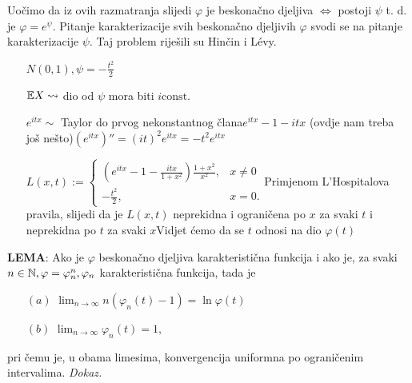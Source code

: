 \documentclass{article}
\begin{document}
 Uočimo da iz ovih razmatranja slijedi \(\varphi\) je beskonačno djeljiva \(\Leftrightarrow\) postoji \(\psi\) t. d. je \(\varphi=e^\psi.\)\newline
Pitanje karakterizacije svih beskonačno djeljivih \(\varphi\) svodi se na pitanje karakterizacije \(\psi.\) Taj problem riješili su Hinčin i L\'evy.\begin{enumerate}
    \item[] \(N(0,1),\psi=-\frac{t^2}2\)
    \item[] \(\Bbb EX\leadsto\) dio od \(\psi\) mora biti \(i\mathrm{const.}\)
    \item[] \(e^{itx}\sim\) Taylor do prvog nekonstantnog člana\newline \(e^{itx}-1-itx\) (ovdje nam treba još nešto)\newline \(\left(e^{itx}\right)''=(it)^2e^{itx}=-t^2e^{itx}\)
    \item[] \(L(x,t):=\begin{cases}\left(e^{itx}-1-\frac{itx}{1+x^2}\right)\frac{1+x^2}{x^2},&x\ne0\\-\frac{t^2}2,&x=0.\end{cases}\)\newline Primjenom L'Hospitalova pravila, slijedi da je \(L(x,t)\) neprekidna i ograničena po \(x\) za svaki \(t\) i neprekidna po \(t\) za svaki \(x\)\newline Vidjet ćemo da se \(t\) odnosi na dio \(\varphi(t)\)
\end{enumerate}
\textbf{LEMA}:\newline
Ako je \(\varphi\) beskonačno djeljiva karakteristična funkcija i ako je, za svaki \(n\in\Bbb N,\varphi=\varphi_n^n,\varphi_n\) karakteristična funkcija, tada je
\begin{enumerate}
    \item[\((a)\)] \(\displaystyle\lim_{n\to\infty}n\left(\varphi_n(t)-1\right)=\ln\varphi(t)\)
    \item[\((b)\)] \(\displaystyle\lim_{n\to\infty}\varphi_n(t)=1,\)
\end{enumerate} pri čemu je, u obama limesima, konvergencija uniformna po ograničenim intervalima.\newline\newline
\textit{Dokaz.}
\end{document}

